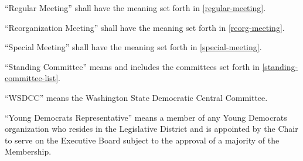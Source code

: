 \begin{alphalist}
    \item “Regular Meeting” shall have the meaning set forth in \autoref{regular-meeting}.
    \item “Reorganization Meeting” shall have the meaning set forth in \autoref{reorg-meeting}.
    \item “Special Meeting” shall have the meaning set forth in \autoref{special-meeting}.
    \item “Standing Committee” means and includes the committees set forth in \autoref{standing-committee-list}.
    \item “WSDCC” means the Washington State Democratic Central Committee.
    \item “Young Democrats Representative” means a member of any Young Democrats organization who resides in the \fortythird{} Legislative District and is appointed by the Chair to serve on the Executive Board subject to the approval of a majority of the Membership.
\end{alphalist}

